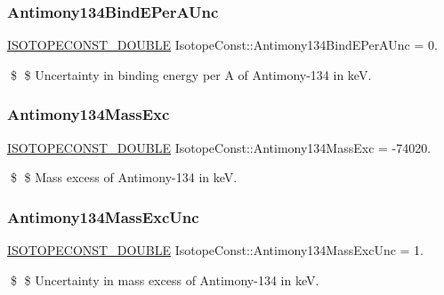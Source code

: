 \subsubsection{\texorpdfstring{Antimony134\+Bind\+E\+Per\+A\+Unc}{Antimony134BindEPerAUnc}}
{\footnotesize\ttfamily \mbox{\hyperlink{group___isotope_const-_macros_ga8f45a7272ce02c0b4c65c44636ed719a}{I\+S\+O\+T\+O\+P\+E\+C\+O\+N\+S\+T\+\_\+\+D\+O\+U\+B\+LE}} Isotope\+Const\+::\+Antimony134\+Bind\+E\+Per\+A\+Unc = 0.}

\$ \$ Uncertainty in binding energy per A of Antimony-\/134 in keV. \mbox{\label{group___isotope_const-_antimony-_sb134_ga63c47f3c02167f5a3d7d6657c0027680}} 
\subsubsection{\texorpdfstring{Antimony134\+Mass\+Exc}{Antimony134MassExc}}
{\footnotesize\ttfamily \mbox{\hyperlink{group___isotope_const-_macros_ga8f45a7272ce02c0b4c65c44636ed719a}{I\+S\+O\+T\+O\+P\+E\+C\+O\+N\+S\+T\+\_\+\+D\+O\+U\+B\+LE}} Isotope\+Const\+::\+Antimony134\+Mass\+Exc = -\/74020.}

\$ \$ Mass excess of Antimony-\/134 in keV. \mbox{\label{group___isotope_const-_antimony-_sb134_ga02f2018869cf02b915f73c8de83f95c9}} 
\subsubsection{\texorpdfstring{Antimony134\+Mass\+Exc\+Unc}{Antimony134MassExcUnc}}
{\footnotesize\ttfamily \mbox{\hyperlink{group___isotope_const-_macros_ga8f45a7272ce02c0b4c65c44636ed719a}{I\+S\+O\+T\+O\+P\+E\+C\+O\+N\+S\+T\+\_\+\+D\+O\+U\+B\+LE}} Isotope\+Const\+::\+Antimony134\+Mass\+Exc\+Unc = 1.}

\$ \$ Uncertainty in mass excess of Antimony-\/134 in keV. \mbox{\label{group___isotope_const-_antimony-_sb134_ga343896b20b398c028597367e12175b64}} 
